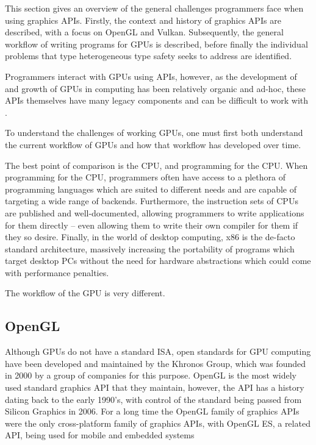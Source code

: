\documentclass[a4paper,12pt,twoside,openright]{report}
\begin{document}
This section gives an overview of the general challenges programmers face when
using graphics APIs. Firstly, the context and history of graphics APIs are
described, with a focus on OpenGL and Vulkan. Subsequently, the general
workflow of writing programs for GPUs is described, before finally the
individual problems that type heterogeneous type safety seeks to address are
identified.

Programmers interact with GPUs using APIs, however, as the development of and
growth of GPUs in computing has been relatively organic and ad-hoc, these APIs
themselves have many legacy components and can be difficult to work with
\cite{NVIDIAInternshipLessons}.


To understand the challenges of working GPUs, one must first both understand
the current workflow of GPUs and how that workflow has developed over time.

The best point of comparison is the CPU, and programming for the CPU. When
programming for the CPU, programmers often have access to a plethora of
programming languages which are suited to different needs and are capable of
targeting a wide range of backends. Furthermore, the instruction sets of CPUs
are published and well-documented, allowing programmers to write applications
for them directly -- even allowing them to write their own compiler for them
if they so desire. Finally, in the world of desktop computing, x86 is the
de-facto standard architecture, massively increasing the portability of
programs which target desktop PCs without the need for hardware abstractions
which could come with performance penalties.

The workflow of the GPU is very different.

\subsection{OpenGL}

Although GPUs do not have a standard ISA, open standards for GPU computing have
been developed and maintained by the Khronos Group, which was
founded in 2000 by a group of companies for this purpose. OpenGL is the most
widely used standard graphics API that they maintain, however, the API has a
history dating back to the early 1990's, with control of the
standard being passed from Silicon Graphics in 2006. For a long
time the OpenGL family of graphics APIs were the only cross-platform family of
graphics APIs, with OpenGL ES, a related API, being used for mobile and
embedded systems
\end{document}
